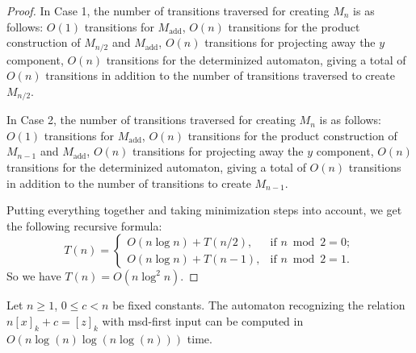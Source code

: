 \documentclass[12pt,reqno]{article}
\def\add{\text{add}}
\begin{document}
\begin{proof}
In Case 1, the number of transitions traversed for creating $M_n$ is as follows: $O(1)$ transitions for $M_{\add}$, $O(n)$ transitions for the product construction of $M_{n/2}$ and $M_{\add}$, $O(n)$ transitions for projecting away the $y$ component, $O(n)$ transitions for the determinized automaton, giving a total of $O(n)$ transitions in addition to the number of transitions traversed to create $M_{n/2}$.

In Case 2, the number of transitions traversed for creating $M_n$ is as follows: $O(1)$ transitions for $M_{\add}$, $O(n)$ transitions for the product construction of $M_{n-1}$ and $M_{\add}$, $O(n)$ transitions for projecting away the $y$ component, $O(n)$ transitions for the determinized automaton, giving a total of $O(n)$ transitions in addition to the number of transitions to create $M_{n-1}$.

Putting everything together and taking minimization steps into account, we get the following recursive formula:
\[ T(n) = 
\begin{cases}
    O(n \log n) + T(n/2), & \text{if $n \bmod 2 = 0$}; \\
    O(n \log n) + T(n-1), & \text{if $n \bmod 2 = 1$}.
\end{cases}
\]
So we have $T(n) = O(n\log^2 n)$.    
\end{proof}


\begin{theorem} \label{theorem:n[x]+c=[z]-time}
    Let $n \geq 1$, $0 \leq c < n$ be fixed constants. The automaton recognizing the relation $n[x]_k + c = [z]_k$ with msd-first input can be computed in $O( n\log (n) \log(n \log (n) ) )$ time.
\end{theorem}
\end{document}
